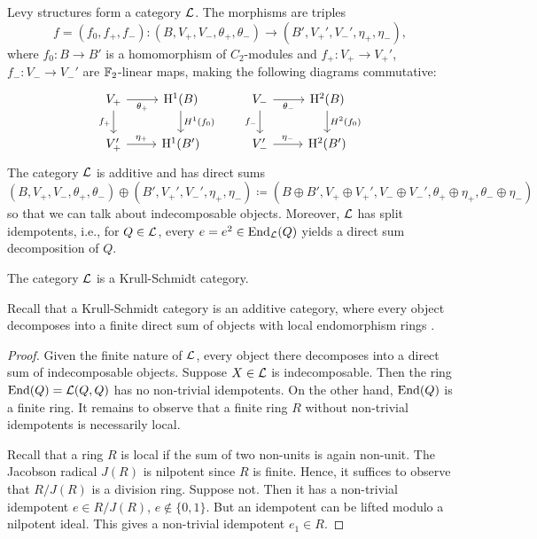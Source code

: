 Levy structures form a category ${\mathcal L}$. The morphisms are triples
\[f=(f_0,f_+,f_-): (B, V_+, V_-, {\theta_+}, {\theta_-} ) \to (B', V_+', V_-', {\eta_+}, {\eta_-} ),\]
where $f_0: B\to B'$ is a homomorphism of $C_2$-modules and $f_+ : V_+ \to V_+'$,
$f_- : V_- \to V_-'$ are ${\mathbb F}_2$-linear maps, making the following diagrams commutative:
\begin{equation} \label{equality_1}
  \begin{tikzcd}
	V_+ & \HH^1(B)  \\
	V_+' & \HH^1(B') 
	\arrow["\theta_+"', from=1-1, to=1-2]
	\arrow["H^1(f_0)", from=1-2, to=2-2]
	\arrow["\eta_+", from=2-1, to=2-2]
	\arrow["f_+"', from=1-1, to=2-1]
  \end{tikzcd}
\quad \quad
  \begin{tikzcd}
	V_- & \HH^2(B)  \\
	V_-' & \HH^2(B') 
	\arrow["\theta_-"', from=1-1, to=1-2]
	\arrow["H^2(f_0)", from=1-2, to=2-2]
	\arrow["\eta_-", from=2-1, to=2-2]
	\arrow["f_-"', from=1-1, to=2-1]
  \end{tikzcd}
\end{equation}
The category 
${\mathcal L}$ is additive and has direct sums
\[(B, V_+, V_-, {\theta_+}, {\theta_-} ) \oplus (B', V_+', V_-', {\eta_+}, {\eta_-} ) \coloneqq (B\oplus B', V_+ \oplus V_+', V_- \oplus V_-', {\theta_+}\oplus{\eta_+}, {\theta_-}\oplus{\eta_-} )\]
so that we can talk about indecomposable objects. Moreover, ${\mathcal L}$ has split idempotents, i.e., for $Q \in {\mathcal L}$, every $e=e^2 \in \operatorname{End}_{{\mathcal L}}(Q)$ yields a direct sum decomposition of $Q$. 
\begin{prop} \label{sLk}
  The category ${\mathcal L}$ is a Krull-Schmidt category.
\end{prop}

  Recall that a Krull-Schmidt category is an additive category, where every object decomposes into a finite direct sum of objects
  with local endomorphism rings \cite{Krause}.

\begin{proof}
Given the finite nature of  ${\mathcal L}$, every object there decomposes into a direct sum of indecomposable objects. Suppose $X\in{\mathcal L}$ is indecomposable.
  Then the ring $\operatorname{End}(Q) = {\mathcal L} (Q,Q)$ has no non-trivial idempotents.
  On the other hand, $\operatorname{End}(Q)$ is a finite ring. It remains to observe that a finite ring $R$ without non-trivial idempotents is necessarily local.

  Recall that a ring $R$ is local if the sum of two non-units is again non-unit.
  The Jacobson radical $J(R)$ is nilpotent since $R$ is finite.
  Hence, it suffices to observe that $R/J(R)$ is a division ring. Suppose not. Then it has a non-trivial idempotent $e\in R/J(R)$, $e\not\in\{0,1\}$.
  But an idempotent can be lifted modulo a nilpotent ideal. This gives a non-trivial idempotent $e_1 \in R$.
\end{proof}  


